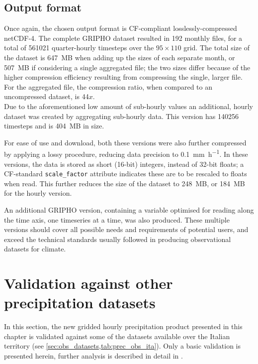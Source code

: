 \subsection{Output format}
Once again, the chosen output format is CF-compliant losslessly-compressed netCDF-4. The complete GRIPHO dataset resulted in 192 monthly files, for a total of 561021 quarter-hourly timesteps over the $95 \times 110$ grid. The total size of the dataset is \SI{647}{\mega B} when adding up the sizes of each separate month, or \SI{507}{\mega B} if considering a single aggregated file; the two sizes differ because of the higher compression efficiency resulting from compressing the single, larger file. For the aggregated file, the compression ratio, when compared to an uncompressed dataset, is 44$x$.\\
Due to the aforementioned low amount of sub-hourly values an additional, hourly dataset was created by aggregating sub-hourly data. This version has 140256 timesteps and is \SI{404}{\mega B} in size.

For ease of use and download, both these versions were also further compressed by applying a lossy procedure, reducing data precision to \SI{0.1}{\milli\meter\per\hour}. In these versions, the data is stored as short (16-bit) integers, instead of 32-bit floats; a CF-standard \texttt{scale\_factor} attribute indicates these are to be rescaled to floats when read. This further reduces the size of the dataset to \SI{248}{\mega B}, or \SI{184}{\mega B} for the hourly version.

An additional GRIPHO version, containing a variable optimised for reading along the time axis, one timeseries at a time, was also produced. These multiple versions should cover all possible needs and requirements of potential users, and exceed the technical standards usually followed in producing observational datasets for climate.

\section{Validation against other precipitation datasets}\label{sec:valid_itaobs}
In this section, the new gridded hourly precipitation product presented in this chapter is validated against some of the datasets available over the Italian territory (see \cref{sec:obs_datasets,tab:prec_obs_ita}).
Only a basic validation is presented herein, further analysis is described in detail in \citet[][in preparation]{Fantini2019a}.

